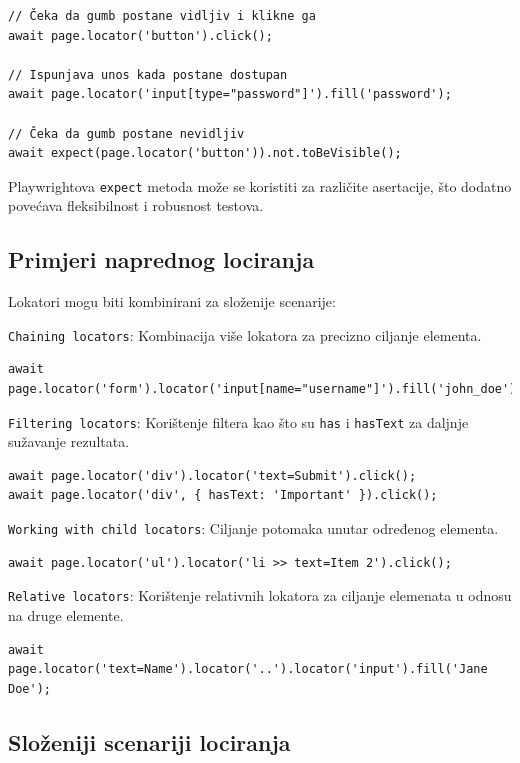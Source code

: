 \begin{verbatim}
// Čeka da gumb postane vidljiv i klikne ga
await page.locator('button').click();

// Ispunjava unos kada postane dostupan
await page.locator('input[type="password"]').fill('password');

// Čeka da gumb postane nevidljiv
await expect(page.locator('button')).not.toBeVisible();
\end{verbatim}

Playwrightova \texttt{expect} metoda može se koristiti za različite asertacije, što dodatno povećava fleksibilnost i robusnost testova.

\subsection*{Primjeri naprednog lociranja}

Lokatori mogu biti kombinirani za složenije scenarije:

\texttt{Chaining locators}: Kombinacija više lokatora za precizno ciljanje elementa.

\begin{verbatim}
await page.locator('form').locator('input[name="username"]').fill('john_doe');
\end{verbatim}

\texttt{Filtering locators}: Korištenje filtera kao što su \texttt{has} i \texttt{hasText} za daljnje sužavanje rezultata.

\begin{verbatim}
await page.locator('div').locator('text=Submit').click();
await page.locator('div', { hasText: 'Important' }).click();
\end{verbatim}

\texttt{Working with child locators}: Ciljanje potomaka unutar određenog elementa.

\begin{verbatim}
await page.locator('ul').locator('li >> text=Item 2').click();
\end{verbatim}

\texttt{Relative locators}: Korištenje relativnih lokatora za ciljanje elemenata u odnosu na druge elemente.

\begin{verbatim}
await page.locator('text=Name').locator('..').locator('input').fill('Jane Doe');
\end{verbatim}

\subsection*{Složeniji scenariji lociranja}


